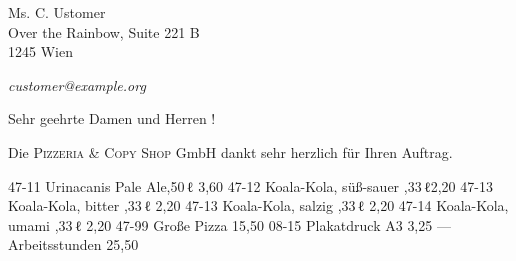 \documentclass[fontsize=11pt,parskip=full]{scrlttr2}
\begin{document}
	\def\payperiod		{7}		%
					\def\invoicenumber	{42}	%
	\begin{letter}{%
%
					Ms. C. Ustomer\\
					Over the Rainbow, Suite 221\kern 1pt B\\
					1245 Wien\\				
					\vspace{.25em}\par		%
					 \hfill\emph{customer@example.org}
	}
		\opening{Sehr geehrte Damen und Herren\kern 1pt !}

		Die \textsc{Pizzeria \& Copy Shop} GmbH dankt sehr herzlich 
		für Ihren Auftrag.

		\begin{invoice*}[N]				%
			\NumbersOn					%
			\SeparatorOff

			\makeatletter\renewcommand*{}\makeatother	

			\renewcommand*\headerformat{\scriptsize}	

	{47-11}		{Urinacanis Pale Ale,50\,ℓ}	{3,60}
	{47-12}		{Koala-Kola, süß-sauer ,33\,ℓ}{2,20}
	{47-13}		{Koala-Kola, bitter ,33\,ℓ}	{2,20}
	{47-13}		{Koala-Kola, salzig ,33\,ℓ}	{2,20}
	{47-14}		{Koala-Kola, umami ,33\,ℓ}	{2,20}
	{47-99}		{Große Pizza}						{15,50}
	{08-15}		{Plakatdruck \tab A3}				{3,25}
	{---~~~}	{Arbeitsstunden}					{25,50}

\enlargethispage{3\baselineskip}	%

		\end{invoice*}



\end{letter}
\end{document}
